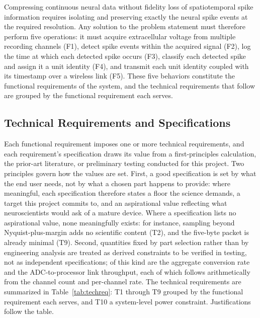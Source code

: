 \documentclass[11pt]{article}
\begin{document}
Compressing continuous neural data without fidelity loss of spatiotemporal spike
information requires isolating and preserving exactly the neural spike events at the
required resolution. Any solution to the problem statement must therefore
perform five operations: it must acquire extracellular voltage from multiple
recording channels (F1), detect spike events within the acquired signal (F2), log the time
at which each detected spike occurs (F3), classify each detected spike and assign it a
unit identity (F4), and transmit each unit identity coupled with its timestamp over a
wireless link (F5). These five behaviors constitute the functional requirements of the
system, and the technical requirements that follow are grouped by the functional
requirement each serves.


\subsection{Technical Requirements and Specifications}
Each functional requirement imposes one or more technical requirements, and each
requirement's specification draws its value from a first-principles calculation, the
prior-art literature, or preliminary testing conducted for this project. Two principles
govern how the values are set. First, a good specification is set by what the end user
needs, not by what a chosen part happens to provide: where meaningful, each specification
therefore states a floor the science demands, a target this project commits to, and an
aspirational value reflecting what neuroscientists would ask of a mature device. Where a
specification lists no aspirational value, none meaningfully exists: for instance, sampling beyond
Nyquist-plus-margin adds no scientific content (T2), and the five-byte packet is already
minimal (T9). Second,
quantities fixed by part selection rather than by engineering analysis are treated as
derived constraints to be verified in testing, not as independent specifications; of this
kind are the aggregate conversion rate and the ADC-to-processor link throughput, each of
which follows arithmetically from the channel count and per-channel rate. The technical
requirements are summarized in Table~\ref{tab:techreq}: T1 through T9 grouped by the
functional requirement each serves, and T10 a system-level power constraint.
Justifications follow the table.
\end{document}
